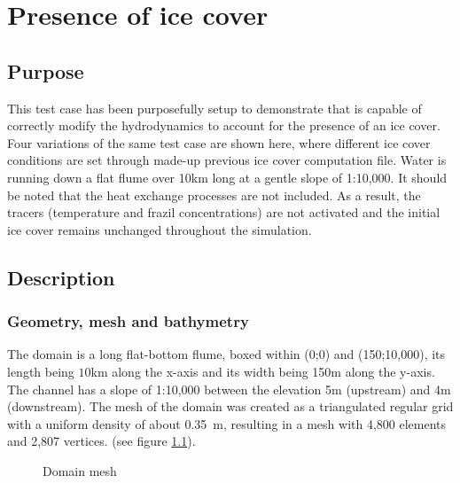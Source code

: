 \renewcommand{\labelitemi}{$\triangleright$}

\chapter{Presence of ice cover}
%
%
\section{Purpose}
This test case has been purposefully setup to demonstrate that \khione is capable of correctly modify the hydrodynamics to account for the presence of an ice cover. 
Four variations of the same test case are shown here, where different ice cover conditions are set through made-up previous ice cover computation file. Water is running down a flat flume over 10km long at a gentle slope of 1:10,000. 
It should be noted that the heat exchange processes are not included. As a result, the tracers (temperature and frazil concentrations) are not activated and the initial ice cover remains unchanged throughout the simulation.

\section{Description}

\subsection{Geometry, mesh and bathymetry}

The domain is a long flat-bottom flume, boxed within (0;0) and (150;10,000), its length being $10$km along the x-axis and its width being 150m along the y-axis. The channel has a slope of 1:10,000 between the elevation 5m (upstream) and 4m (downstream).
The mesh of the domain was created as a triangulated regular grid with a uniform density of about 0.35~m, resulting in a mesh with 4,800 elements and 2,807 vertices. (see figure \ref{fig:cover_mesh}).

\begin{figure}[H]
    \begin{center}
    \end{center}
    \caption{Domain mesh}
    \label{fig:cover_mesh}
\end{figure}

